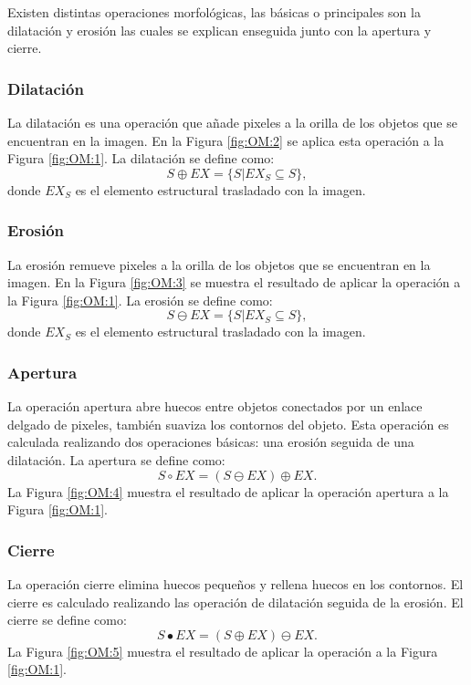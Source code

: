 Existen distintas operaciones morfológicas, las básicas o principales son la dilatación y erosión las cuales se explican enseguida junto con la apertura y cierre. 
 
\subsubsection{Dilatación}\label{sssec:Dilatation}
La dilatación es una operación que añade pixeles a la orilla de los objetos que se encuentran en la imagen. En la Figura \ref{fig:OM:2} 
se aplica esta operación a la Figura \ref{fig:OM:1}.
La dilatación se define como:  
\begin{equation}
S \oplus EX = \lbrace S|EX_S \subseteq S \rbrace,
\end{equation}
donde $EX_S$ es el elemento estructural trasladado con la imagen. 

\subsubsection{Erosión}\label{sssec:OMerosion}
La erosión remueve pixeles a la orilla de los objetos que se encuentran en la imagen. En la Figura \ref{fig:OM:3} se muestra el resultado de aplicar la operación a la Figura \ref{fig:OM:1}.
La erosión se define como: 
\begin{equation}
S \ominus EX = \lbrace S|EX_S \subseteq S \rbrace,
\end{equation}
donde $EX_S$ es el elemento estructural trasladado con la imagen. 

\subsubsection{Apertura}\label{sssec:Opening} 
La operación apertura abre huecos entre objetos conectados por un enlace delgado de pixeles, también suaviza los contornos del objeto. Esta operación es calculada realizando dos operaciones básicas: una erosión seguida de una dilatación. 
La apertura se define como:  
\begin{equation}
S \circ EX = (S \ominus EX) \oplus EX.
\end{equation}
La Figura \ref{fig:OM:4} muestra el resultado de aplicar la operación apertura a la Figura \ref{fig:OM:1}.

\subsubsection{Cierre}\label{sssec:Closure}
La operación cierre elimina huecos pequeños y rellena huecos en los contornos. El cierre es calculado realizando las operación de dilatación seguida de la erosión.
El cierre se define como:
\begin{equation}
S \bullet EX = (S \oplus EX) \ominus EX.
\end{equation}
La Figura \ref{fig:OM:5} muestra el resultado de aplicar la operación a la Figura \ref{fig:OM:1}.

